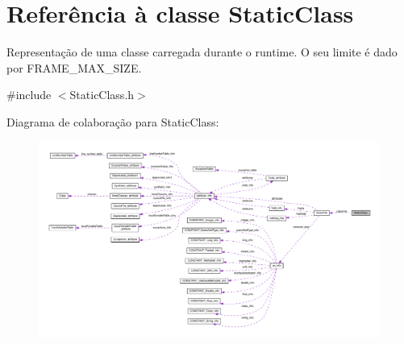 \hypertarget{classStaticClass}{}\section{Referência à classe Static\+Class}
\label{classStaticClass}


Representação de uma classe carregada durante o runtime. O seu limite é dado por {\ttfamily F\+R\+A\+M\+E\+\_\+\+M\+A\+X\+\_\+\+S\+I\+ZE}.  




{\ttfamily \#include $<$Static\+Class.\+h$>$}



Diagrama de colaboração para Static\+Class\+:\nopagebreak
\begin{figure}[H]
\begin{center}
\leavevmode
\includegraphics[width=350pt]{classStaticClass__coll__graph}
\end{center}
\end{figure}
